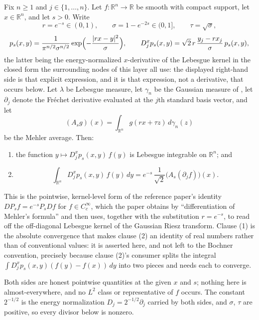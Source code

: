 \begin{lemma}[The kernel form of the Mehler gradient: $\int D_j^xp_s(x,y)f(y)\,dy = e^{-s}(A_s(D_jf))(x)$]
Fix $n \geq 1$ and $j \in \{1,\ldots,n\}$.  Let $f : \mathbb{R}^n \to \mathbb{R}$ be smooth
with compact support, let $x \in \mathbb{R}^n$, and let $s > 0$.  Write
\[
  r = e^{-s} \in (0,1), \qquad \sigma = 1-e^{-2s} \in (0,1],
  \qquad \tau = \sqrt\sigma ,
\]
\[
  p_s(x,y) = \frac{1}{\pi^{n/2}\sigma^{n/2}}
      \exp\Bigl(-\frac{|rx-y|^2}{\sigma}\Bigr),
  \qquad
  D_j^xp_s(x,y) = \sqrt2\,r\,\frac{y_j-rx_j}{\sigma}\,p_s(x,y) ,
\]
the latter being the energy-normalized $x$-derivative of the Lebesgue kernel in the closed
form the surrounding nodes of this layer all use: the displayed right-hand side is that
explicit expression, and it is that expression, not a derivative, that occurs below.  Let
$\lambda$ be Lebesgue measure, let $\gamma_n$ be the Gaussian measure of
, let $\partial_j$ denote the Fr\'echet derivative evaluated at the
$j$th standard basis vector, and let
\[
  (A_sg)(x) = \int_{\mathbb{R}^n} g(rx+\tau z)\,d\gamma_n(z)
\]
be the Mehler average.  Then:
\begin{enumerate}
\item the function $y \mapsto D_j^xp_s(x,y)\,f(y)$ is Lebesgue integrable on
$\mathbb{R}^n$; and
\item
\[
  \int_{\mathbb{R}^n} D_j^xp_s(x,y)\,f(y)\,dy
    = e^{-s}\,\frac{1}{\sqrt2}\bigl(A_s(\partial_jf)\bigr)(x) .
\]
\end{enumerate}

This is the pointwise, kernel-level form of the reference paper's identity
$DP_sf = e^{-s}P_sDf$ for $f \in C_c^\infty$, which the paper obtains by
``differentiation of Mehler's formula'' and then uses, together with the substitution
$r = e^{-s}$, to read off the off-diagonal Lebesgue kernel of the Gaussian Riesz
transform.  Clause (1) is the absolute convergence that makes clause (2) an identity of
real numbers rather than of conventional values: it is asserted here, and not left to the
Bochner convention, precisely because clause (2)'s consumer splits the integral
$\int D_j^xp_s(x,y)(f(y)-f(x))\,dy$ into two pieces and needs each to converge.

Both sides are honest pointwise quantities at the given $x$ and $s$; nothing here is
almost-everywhere, and no $L^2$ class or representative of $f$ occurs.  The constant
$2^{-1/2}$ is the energy normalization $D_j = 2^{-1/2}\partial_j$ carried by both sides,
and $\sigma$, $\tau$ are positive, so every divisor below is nonzero.
\end{lemma}
